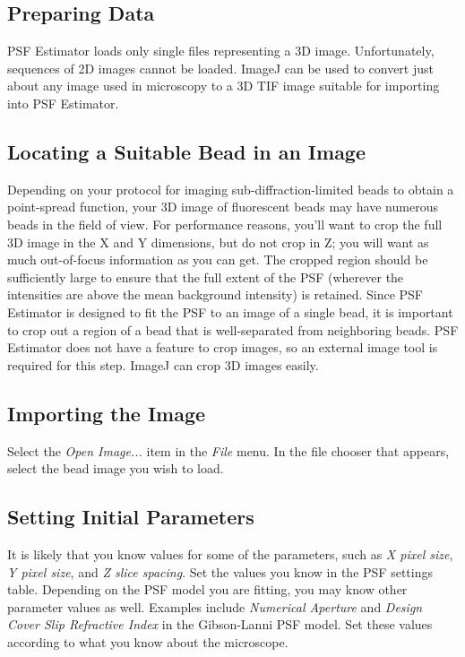 \documentclass[11pt,titlepage,twoside]{article}
\begin{document}
\subsection{Preparing Data}

PSF Estimator loads only single files representing a 3D image. Unfortunately, sequences of 2D images cannot be loaded. ImageJ can be used to convert just about any image used in microscopy to a 3D TIF image suitable for importing into PSF Estimator.

\subsection{Locating a Suitable Bead in an Image}

Depending on your protocol for imaging sub-diffraction-limited beads to obtain a point-spread function, your 3D image of fluorescent beads may have numerous beads in the field of view. For performance reasons, you'll want to crop the full 3D image in the X and Y dimensions, but do not crop in Z; you will want as much out-of-focus information as you can get. The cropped region should be sufficiently large to ensure that the full extent of the PSF (wherever the intensities are above the mean background intensity) is retained. Since PSF Estimator is designed to fit the PSF to an image of a single bead, it is important to crop out a region of a bead that is well-separated from neighboring beads. PSF Estimator does not have a feature to crop images, so an external image tool is required for this step. ImageJ can crop 3D images easily.

\subsection{Importing the Image}

Select the \emph{Open Image...} item in the \emph{File} menu. In the file chooser that appears, select the bead image you wish to load.

\subsection{Setting Initial Parameters}

It is likely that you know values for some of the parameters, such as \emph{X pixel size}, \emph{Y pixel size}, and \emph{Z slice spacing}. Set the values you know in the PSF settings table. Depending on the PSF model you are fitting, you may know other parameter values as well. Examples include \emph{Numerical Aperture} and \emph{Design Cover Slip Refractive Index} in the Gibson-Lanni PSF model. Set these values according to what you know about the microscope.
\end{document}
